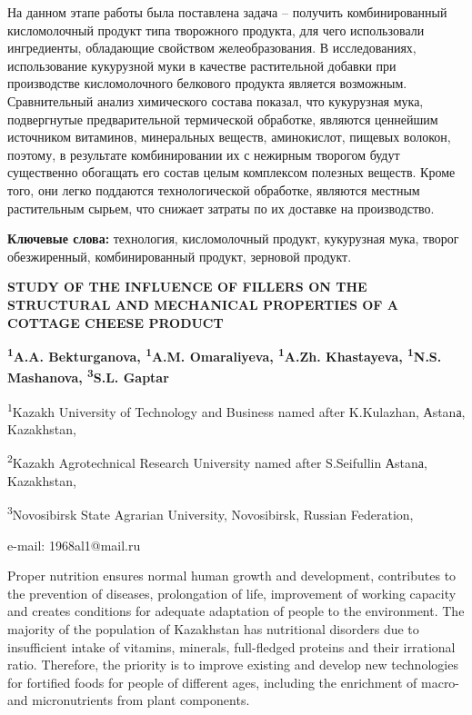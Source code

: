 На данном этапе работы была поставлена задача -- получить
комбинированный кисломолочный продукт типа творожного продукта, для чего
использовали ингредиенты, обладающие свойством желеобразования. В
исследованиях, использование кукурузной муки в качестве растительной
добавки при производстве кисломолочного белкового продукта является
возможным. Сравнительный анализ химического состава показал, что
кукурузная мука, подвергнутые предварительной термической обработке,
являются ценнейшим источником витаминов, минеральных веществ,
амино­кислот, пищевых волокон, поэтому, в результате комбинировании их с
нежир­ным творогом будут существенно обогащать его состав целым
комплексом полезных веществ. Кроме того, они легко поддаются
технологической обра­ботке, являются местным растительным сырьем, что
снижает затраты по их доставке на производство.

{\bfseries Ключевые слова:} технология, кисломолочный продукт, кукурузная
мука, творог обезжиренный, комбинированный продукт, зерновой продукт.

\begin{articleheader}
{\bfseries STUDY OF THE INFLUENCE OF FILLERS ON THE STRUCTURAL AND MECHANICAL PROPERTIES OF A COTTAGE CHEESE PRODUCT}

{\bfseries
\textsuperscript{1}A.A. Bekturganova\textsuperscript{\envelope },
\textsuperscript{1}A.M. Omaraliyeva,
\textsuperscript{1}A.Zh. Khastayeva,
\textsuperscript{1}N.S. Mashanova,
\textsuperscript{3}S.L. Gaptar
}
\end{articleheader}

\begin{affiliation}
\textsuperscript{1}Kazakh University of Technology and Business named after K.Kulazhan, Аstanа, Kazakhstan,

\textsuperscript{2}Kazakh Agrotechnical Research University named after S.Seifullin Аstanа, Kazakhstan,

\textsuperscript{3}Novosibirsk State Agrarian University, Novosibirsk, Russian Federation,

e-mail: 1968al1@mail.ru
\end{affiliation}

Proper nutrition ensures normal human growth and development,
contributes to the prevention of diseas\-es, prolongation of life,
improvement of working capacity and creates conditions for adequate
adaptation of people to the environment. The majority of the population
of Kazakhstan has nutritional disorders due to insufficient intake of
vitamins, minerals, full-fledged proteins and their irrational ratio.
Therefore, the priority is to improve existing and develop new
technologies for fortified foods for people of different ages, including
the enrichment of macro- and micronutrients from plant components.

